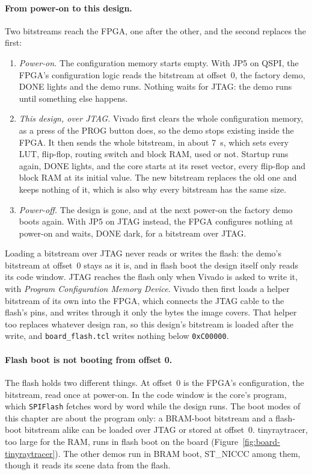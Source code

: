 \documentclass[11pt,a4paper]{report}
\begin{document}
\paragraph{From power-on to this design.} Two bitstreams reach the FPGA, one after the
other, and the second replaces the first:
\begin{enumerate}[leftmargin=*, itemsep=1pt]
  \item \emph{Power-on.} The configuration memory starts empty. With JP5 on QSPI, the FPGA's
    configuration logic reads the bitstream at offset~0, the factory demo, DONE lights and the
    demo runs. Nothing waits for JTAG: the demo runs until something else happens.
  \item \emph{This design, over JTAG.} Vivado first clears the whole configuration memory, as a
    press of the PROG button does, so the demo stops existing inside the FPGA. It then sends the
    whole bitstream, in about 7~s, which sets every LUT, flip-flop, routing switch and block
    RAM, used or not. Startup runs again, DONE lights, and the core starts at its reset vector,
    every flip-flop and block RAM at its initial value. The new bitstream replaces the old one
    and keeps nothing of it, which is also why every bitstream has the same size.
  \item \emph{Power-off.} The design is gone, and at the next power-on the factory demo boots
    again. With JP5 on JTAG instead, the FPGA configures nothing at power-on and waits, DONE
    dark, for a bitstream over JTAG.
\end{enumerate}
Loading a bitstream over JTAG never reads or writes the flash: the demo's bitstream at
offset~0 stays as it is, and in flash boot the design itself only reads its code window. JTAG
reaches the flash only when Vivado is asked to write it, with \emph{Program Configuration
Memory Device}. Vivado then first loads a helper bitstream of its own into the FPGA, which
connects the JTAG cable to the flash's pins, and writes through it only the bytes the image
covers. That helper too replaces whatever design ran, so this design's bitstream is loaded
after the write, and \texttt{board\_flash.tcl} writes nothing below \texttt{0xC00000}.

\paragraph{Flash boot is not booting from offset 0.} The flash holds two different things. At
offset~0 is the FPGA's configuration, the bitstream, read once at power-on. In the code window
is the core's program, which \texttt{SPIFlash} fetches word by word while the design runs. The
boot modes of this chapter are about the program only: a BRAM-boot bitstream and a flash-boot
bitstream alike can be loaded over JTAG or stored at offset~0. tinyraytracer, too large for
the RAM, runs in flash boot on the board (Figure~\ref{fig:board-tinyraytracer}). The other demos
run in BRAM boot, ST\_NICCC among them, though it reads its scene data from the flash.
\end{document}
